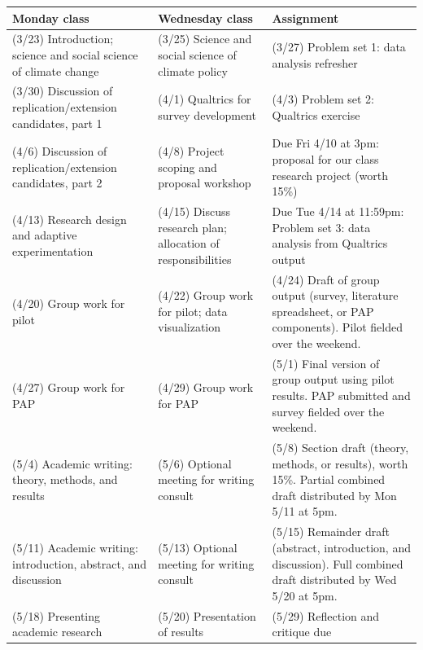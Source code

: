 \documentclass[letterpaper, 12pt, parskip=full, DIV=10]{scrartcl}
\begin{document}
\small
\setlength{\LTpre}{0pt}
\setlength{\LTpost}{0pt}
\renewcommand{\arraystretch}{1.1}
\begin{longtable}{@{}>{\raggedright\arraybackslash}p{}>{\raggedright\arraybackslash}p{}>{\raggedright\arraybackslash}p{}@{}}
\textbf{Monday class} & \textbf{Wednesday class} & \textbf{Assignment} \\
\midrule
\endhead
(3/23) Introduction; science and social science of climate change &
(3/25) Science and social science of climate policy &
(3/27) Problem set 1: data analysis refresher \\

(3/30) Discussion of replication/extension candidates, part 1 &
(4/1) Qualtrics for survey development &
(4/3) Problem set 2: Qualtrics exercise \\

(4/6) Discussion of replication/extension candidates, part 2 &
(4/8) Project scoping and proposal workshop &
Due Fri 4/10 at 3pm: proposal for our class research project (worth 15\%) \\

(4/13) Research design and adaptive experimentation &
(4/15) Discuss research plan; allocation of responsibilities &
Due Tue 4/14 at 11:59pm: Problem set 3: data analysis from Qualtrics output \\

(4/20) Group work for pilot &
(4/22) Group work for pilot; data visualization &
(4/24) Draft of group output (survey, literature spreadsheet, or PAP components). Pilot fielded over the weekend. \\

(4/27) Group work for PAP &
(4/29) Group work for PAP &
(5/1) Final version of group output using pilot results. PAP submitted and survey fielded over the weekend. \\

(5/4) Academic writing: theory, methods, and results &
(5/6) Optional meeting for writing consult &
(5/8) Section draft (theory, methods, or results), worth 15\%. Partial combined draft distributed by Mon 5/11 at 5pm. \\

(5/11) Academic writing: introduction, abstract, and discussion &
(5/13) Optional meeting for writing consult &
(5/15) Remainder draft (abstract, introduction, and discussion). Full combined draft distributed by Wed 5/20 at 5pm. \\

(5/18) Presenting academic research &
(5/20) Presentation of results &
(5/29) Reflection and critique due \\
\end{longtable}
\normalsize
\end{document}
